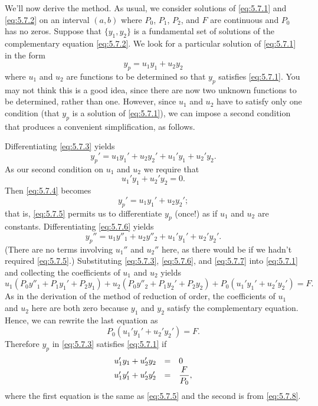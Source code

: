 We'll now derive the method. As usual, we consider solutions of \eqref{eq:5.7.1} and
\eqref{eq:5.7.2} on an interval $(a,b)$ where $P_{0}$, $P_{1}$, $P_{2}$, and $F$ are continuous and
$P_{0}$ has no zeros. Suppose that $\{y_{1},y_{2}\}$ is a fundamental set of solutions of the
complementary equation \eqref{eq:5.7.2}. We look for a particular solution of \eqref{eq:5.7.1} in
the form
\begin{equation}
  \label{eq:5.7.3}y_{p}=u_{1}y_{1}+u_{2}y_{2}
\end{equation}
where $u_{1}$ and $u_{2}$ are functions to be determined so that $y_{p}$ satisfies \eqref{eq:5.7.1}.
You may not think this is a good idea, since there are now two unknown functions to be determined,
rather than one. However, since $u_{1}$ and $u_{2}$ have to satisfy only one condition (that $y_{p}$
is a solution of \eqref{eq:5.7.1}), we can impose a second condition that produces a convenient
simplification, as follows.

Differentiating \eqref{eq:5.7.3} yields
\begin{equation}
  \label{eq:5.7.4}y_{p}'=u_{1}y_{1}'+u_{2}y_{2}'+u_{1}'y_{1}+u_{2}'y_{2}.
\end{equation}
As our second condition on $u_{1}$ and $u_{2}$ we require that
\begin{equation}
  \label{eq:5.7.5}u_{1}'y_{1}+u_{2}'y_{2}=0.
\end{equation}
Then \eqref{eq:5.7.4} becomes
\begin{equation}
  y_{p}'=u_{1}y_{1}'+u_{2}y_{2}';\label{eq:5.7.6}
\end{equation}
that is, \eqref{eq:5.7.5} permits us to differentiate $y_{p}$ (once!) as if $u_{1}$ and $u_{2}$ are
constants. Differentiating \eqref{eq:5.7.6} yields
\begin{equation}
  \label{eq:5.7.7}y_{p}''=u_{1}y''_{1}+u_{2}y''_{2}+u_{1}'y_{1}'+u_{2}'y_{2}'.
\end{equation}
(There are no terms involving $u_{1}''$ and $u_{2}''$ here, as there would be if we hadn't required
\eqref{eq:5.7.5}.) Substituting \eqref{eq:5.7.3}, \eqref{eq:5.7.6}, and \eqref{eq:5.7.7} into
\eqref{eq:5.7.1} and collecting the coefficients of $u_{1}$ and $u_{2}$ yields
\[
  u_{1}(P_{0}y''_{1}+P_{1}y_{1}'+P_{2}y_{1})+u_{2}(P_{0}y''_{2}+P_{1}y_{2}'+P_{2}y_{2}) +P_{0}(u_{1}'y_{1}'+u_{2}'y_{2}')=F.
\]
As in the derivation of the method of reduction of order, the coefficients of $u_{1}$ and $u_{2}$
here are both zero because $y_{1}$ and $y_{2}$ satisfy the complementary equation. Hence, we can
rewrite the last equation as
\begin{equation}
  \label{eq:5.7.8}P_{0}(u_{1}'y_{1}'+u_{2}'y_{2}')=F.
\end{equation}
Therefore $y_{p}$ in \eqref{eq:5.7.3} satisfies \eqref{eq:5.7.1} if
\begin{equation}
  \label{eq:5.7.9}
  \begin{array}{rcl}
    u_{1}'y_{1}+u_{2}'y_{2}   & = & 0                    \\
    u_{1}'y_{1}'+u_{2}'y_{2}' & = & \displaystyle\frac{F}{P_{0}},
  \end{array}
\end{equation}
where the first equation is the same as \eqref{eq:5.7.5} and the second is from \eqref{eq:5.7.8}.

